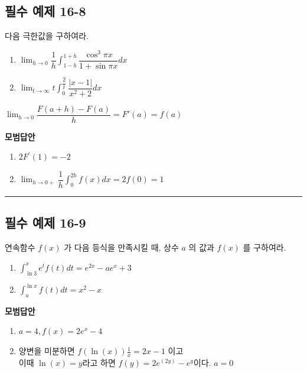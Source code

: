 \documentclass[a4paper,11pt]{article}
\begin{document}
\subsection*{필수 예제 16-8}
다음 극한값을 구하여라. 
\begin{enumerate}[label=(\arabic*)]
    \item $\displaystyle \lim_{h \to 0} \dfrac{1}{h} \int_{1-h}^{1+h} \dfrac{\cos^3 \pi x}{1 + \sin \pi x} dx$
    \item $\displaystyle \lim_{t \to \infty} t \int_{0}^{\dfrac{2}{t}} \dfrac{|x-1|}{x^2+2} dx$
\end{enumerate}

\begin{studybox}
 $\displaystyle \lim_{h \to 0}\dfrac{F(a+h)-F(a)}{h}=F'(a)=f(a) $ 
\end{studybox}

\textbf{모범답안} \\
\begin{enumerate} [label=(\arabic*)]
    \item $2F^{\prime}(1) = -2$
    \item  $\displaystyle \lim_{h \to 0+} \dfrac{1}{h} \int_0^{2h} f(x) dx = 2f(0) = 1$ 
\end{enumerate}

\vspace{0.5cm}
\hrule
\vspace{0.5cm}

\subsection*{필수 예제 16-9}
연속함수 $f(x)$ 가 다음 등식을 만족시킬 때, 상수 $a$ 의 값과 $f(x)$ 를 구하여라. 
\begin{enumerate}[label=(\arabic*)]
    \item $\displaystyle \int_{\ln 3}^{x} e^t f(t) dt = e^{2x} - ae^x + 3$
    \item $\displaystyle \int_{a}^{\ln x} f(t) dt = x^2 - x$
\end{enumerate}

\textbf{모범답안} \\
\begin{enumerate}[label=(\arabic*)]
    \item $a=4, f(x)=2e^x-4$
    \item 양변을 미분하면 $f(\ln(x))\frac{1}{x}= 2x-1$ 이고\\
     이때 $\ln(x)=y$라고 하면 $f(y)=2e^(2y)-e^y$이다. $a=0$
\end{enumerate}
\end{document}

